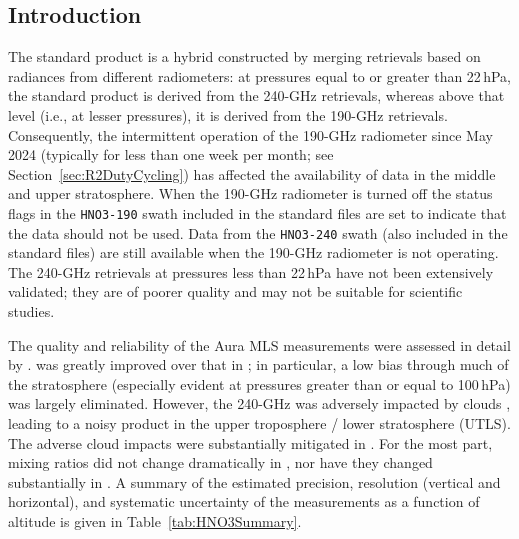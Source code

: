 
\subsection{Introduction}

The standard  product is a hybrid constructed by merging retrievals based on radiances from different radiometers: at pressures equal to or greater than 22\,hPa, the standard product is derived from the \mbox{240\nobreakdash-GHz} retrievals, whereas above that level (i.e., at lesser pressures), it is derived from the \mbox{190\nobreakdash-GHz} retrievals. Consequently, the intermittent operation of the \mbox{190\nobreakdash-GHz} radiometer since May 2024 (typically for less than one week per month; see Section~\ref{sec:R2DutyCycling}) has affected the availability of  data in the middle and upper stratosphere. When the \mbox{190-GHz} radiometer is turned off the status flags in the \texttt{HNO3-190} swath included in the standard  files are set to indicate that the data should not be used. Data from the \texttt{HNO3-240} swath (also included in the standard  files) are still available when the \mbox{190-GHz} radiometer is not operating. The  \mbox{240-GHz} retrievals at pressures less than 22\,hPa have not been extensively validated; they are of poorer quality and may not be suitable for scientific studies.

The quality and reliability of the Aura MLS \vii {} measurements were assessed in detail by \citet{SanteeEtal:2007:HNO3}. \Viii {} was greatly improved over that in \vii; in particular, a low bias through much of the stratosphere (especially evident at pressures greater than or equal to 100\,hPa) was largely eliminated. However, the \viii \mbox{240\nobreakdash-GHz}  was adversely impacted by clouds \citep{EOSMLSV33V34Quality}, leading to a noisy  product in the upper troposphere / lower stratosphere (UTLS). The adverse cloud impacts were substantially mitigated in \viv \citep{EOSMLSV4Quality}. For the most part,  mixing ratios did not change dramatically in \prevv, nor have they changed substantially in \thisv. A summary of the estimated precision, resolution (vertical and horizontal), and systematic uncertainty of the \thisv {} measurements as a function of altitude is given in Table~\ref{tab:HNO3Summary}.

